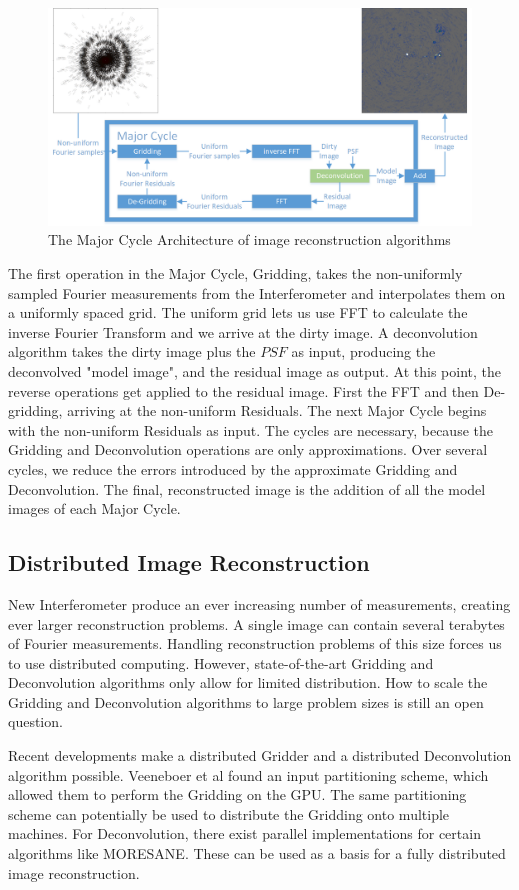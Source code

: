 \begin{figure}[h]
	\centering
	\includegraphics[width=0.80\linewidth]{./chapters/02.hypo/Major-Minor3.png}
	\caption{The Major Cycle Architecture of image reconstruction algorithms}
	\label{hypo:major3}
\end{figure}

The first operation in the Major Cycle, Gridding, takes the non-uniformly sampled Fourier measurements from the Interferometer and interpolates them on a uniformly spaced grid. The uniform grid lets us use FFT to calculate the inverse Fourier Transform and we arrive at the dirty image. A deconvolution algorithm takes the dirty image plus the $PSF$ as input, producing the deconvolved "model image", and the residual image as output. At this point, the reverse operations get applied to the residual image. First the FFT and then De-gridding, arriving at the non-uniform Residuals. The next Major Cycle begins with the non-uniform Residuals as input. The cycles are necessary, because the Gridding and Deconvolution operations are only approximations. Over several cycles, we reduce the errors introduced by the approximate Gridding and Deconvolution. The final, reconstructed image is the addition of all the model images of each Major Cycle. 

\subsection{Distributed Image Reconstruction}
New Interferometer produce an ever increasing number of measurements, creating ever larger reconstruction problems. A single image can contain several terabytes of Fourier measurements. Handling reconstruction problems of this size forces us to use distributed computing. However, state-of-the-art Gridding and Deconvolution algorithms only allow for limited distribution. How to scale the Gridding and Deconvolution algorithms to large problem sizes is still an open question.

Recent developments make a distributed Gridder and a distributed Deconvolution algorithm possible. Veeneboer et al\cite{veenboer2017image} found an input partitioning scheme, which allowed them to perform the Gridding on the GPU. The same partitioning scheme can potentially be used to distribute the Gridding onto multiple machines. For Deconvolution, there exist parallel implementations for certain algorithms like MORESANE\cite{dabbech2015moresane}. These can be used as a basis for a fully distributed image reconstruction.

